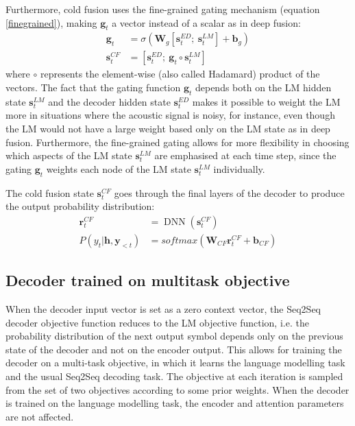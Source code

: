 \documentclass[11pt]{article}
\DeclareMathOperator*{\dnn}{DNN}
\begin{document}
Furthermore, cold fusion uses the fine-grained gating \citep{yang2016words} mechanism (equation \ref{finegrained}), making $\boldsymbol{g}_t$ a vector instead of a scalar as in deep fusion:
\begin{align}
    \boldsymbol{g}_t &= \sigma(\boldsymbol{W}_g[\boldsymbol{s}_t^{ED} ; \ \boldsymbol{s}_t^{LM}]+\boldsymbol{b}_g) \\
    \boldsymbol{s}_t^{CF} &= [\boldsymbol{s}_t^{ED}; \ \boldsymbol{g}_t \circ \boldsymbol{s}_t^{LM}] \label{finegrained}
\end{align}
where $\circ$ represents the element-wise (also called Hadamard) product of the vectors. The fact that the gating function $\boldsymbol{g}_t$ depends both on the LM hidden state $\boldsymbol{s}_t^{LM}$ and the decoder hidden state $\boldsymbol{s}_t^{ED}$ makes it possible to weight the LM more in situations where the acoustic signal is noisy, for instance, even though the LM would not have a large weight based only on the LM state as in deep fusion. Furthermore, the fine-grained gating allows for more flexibility in choosing which aspects of the LM state $\boldsymbol{s}_t^{LM}$ are emphasised at each time step, since the gating $\boldsymbol{g}_t$ weights each node of the LM state $\boldsymbol{s}_t^{LM}$ individually.

The cold fusion state $\boldsymbol{s}_t^{CF}$ goes through the final layers of the decoder to produce the output probability distribution:
\begin{align}
    \boldsymbol{r}_t^{CF} &= \dnn(\boldsymbol{s}_t^{CF}) \\
    P(y_t|\boldsymbol{h}, \boldsymbol{y}_{<t}) &= softmax(\boldsymbol{W}_{CF} \boldsymbol{r}_t^{CF} + \boldsymbol{b}_{CF})
\end{align}





\subsection{Decoder trained on multitask objective}

When the decoder input vector is set as a zero context vector, the Seq2Seq decoder objective function reduces to the LM objective function, i.e. the probability distribution of the next output symbol depends only on the previous state of the decoder and not on the encoder output. This allows for training the decoder on a multi-task objective, in which it learns the language modelling task and the usual Seq2Seq decoding task. The objective at each iteration is sampled from the set of two objectives according to some prior weights. When the decoder is trained on the language modelling task, the encoder and attention parameters are not affected.
\end{document}
